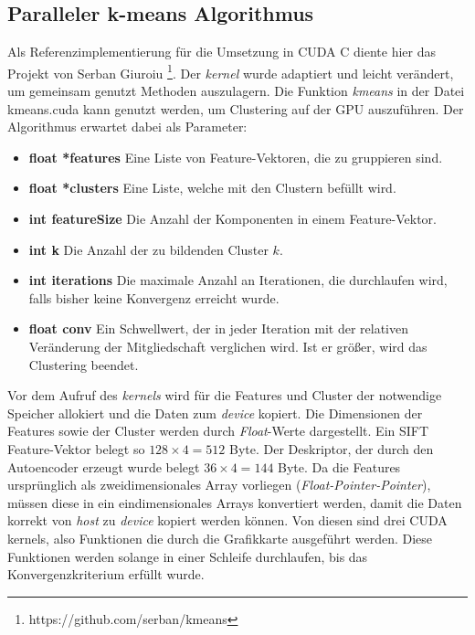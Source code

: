 \subsection{Paralleler k-means Algorithmus}

Als Referenzimplementierung für die Umsetzung in CUDA C diente hier das Projekt von Serban Giuroiu \footnote{https://github.com/serban/kmeans}. Der \textit{kernel} wurde adaptiert und leicht verändert, um gemeinsam genutzt Methoden auszulagern. Die Funktion \textit{kmeans} in der Datei kmeans.cuda kann genutzt werden, um Clustering auf der GPU auszuführen. Der Algorithmus erwartet dabei als Parameter:

\begin{itemize}
	\item \textbf{float *features} Eine Liste von Feature-Vektoren, die zu gruppieren sind.	
	\item \textbf{float *clusters} Eine Liste, welche mit den Clustern befüllt wird.
	\item \textbf{int featureSize} Die Anzahl der Komponenten in einem Feature-Vektor.
	\item \textbf{int k} Die Anzahl der zu bildenden Cluster $k$.
	\item \textbf{int iterations} Die maximale Anzahl an Iterationen, die durchlaufen wird, falls bisher keine Konvergenz erreicht wurde.
	\item \textbf{float conv} Ein Schwellwert, der in jeder Iteration mit der relativen Veränderung der Mitgliedschaft verglichen wird. Ist er größer, wird das Clustering beendet.
\end{itemize}

Vor dem Aufruf des \textit{kernels} wird für die Features und Cluster der notwendige Speicher allokiert und die Daten zum \textit{device} kopiert. Die Dimensionen der Features sowie der Cluster werden durch \textit{Float}-Werte dargestellt. Ein SIFT Feature-Vektor belegt so $128 \times 4 = 512$ Byte. Der Deskriptor, der durch den Autoencoder erzeugt wurde belegt $36 \times 4 = 144$ Byte. Da die Features ursprünglich als zweidimensionales Array vorliegen (\textit{Float-Pointer-Pointer}), müssen diese in ein eindimensionales Arrays konvertiert werden, damit die Daten korrekt von \textit{host} zu \textit{device} kopiert werden können. 
 Von diesen sind drei CUDA kernels, also Funktionen die durch die Grafikkarte ausgeführt werden. Diese Funktionen werden solange in einer Schleife durchlaufen, bis das Konvergenzkriterium erfüllt wurde.

